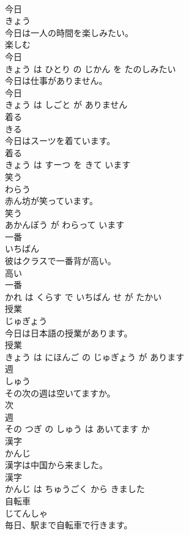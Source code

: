 \documentclass[8pt]{extreport}
\begin{document}
\begin{CJK}{UTF8}{min}
\\	今日	
\\	きょう			
\\	今日は一人の時間を楽しみたい。	
\\	楽しむ 
\\	今日 
\\	きょう は ひとり の じかん を たのしみたい			
\\	今日は仕事がありません。	
\\	今日 
\\	きょう は しごと が ありません			
\\	着る	
\\	きる			
\\	今日はスーツを着ています。	
\\	着る 
\\	きょう は すーつ を きて います			
\\	笑う	
\\	わらう			
\\	赤ん坊が笑っています。	
\\	笑う 
\\	あかんぼう が わらって います			
\\	一番	
\\	いちばん			
\\	彼はクラスで一番背が高い。	
\\	高い 
\\	一番 
\\	かれ は くらす で いちばん せ が たかい			
\\	授業	
\\	じゅぎょう			
\\	今日は日本語の授業があります。	
\\	授業 
\\	きょう は にほんご の じゅぎょう が あります			
\\	週	
\\	しゅう			
\\	その次の週は空いてますか。	
\\	次 
\\	週 
\\	その つぎ の しゅう は あいてます か			
\\	漢字	
\\	かんじ			
\\	漢字は中国から来ました。	
\\	漢字 
\\	かんじ は ちゅうごく から きました			
\\	自転車	
\\	じてんしゃ			
\\	毎日、駅まで自転車で行きます。	

\end{CJK}
\end{document}
